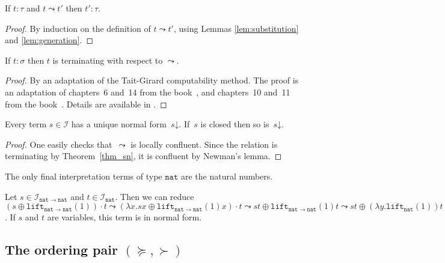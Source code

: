 \documentclass[a4paper,UKenglish,cleveref,autoref,numberwithinsect]{lipics-v2019}
\theoremstyle{definition}
\newcommand{\Iterms}{\mathcal{I}}
\newcommand{\arrtype}{\rightarrow}
\newcommand{\abs}[2]{\lambda #1.#2}
\newcommand{\arrW}{\leadsto}
\newcommand{\nat}{\mathtt{nat}}
\newcommand{\lift}{\mathtt{lift}}
\newcommand{\da}{\mathord{\downarrow}}
\begin{document}
\begin{lemma}
  If $t : \tau$ and $t \arrW t'$ then $t' : \tau$.
\end{lemma}

\begin{proof}
  By induction on the definition of $t \arrW t'$, using
  Lemmas \ref{lem:substitution} and \ref{lem:generation}.
\end{proof}

\begin{theorem}\label{thm_sn}
  If $t : \sigma$ then $t$ is terminating with respect to $\arrW$.
\end{theorem}

\begin{proof}
  By an adaptation of the Tait-Girard computability method. The proof
  is an adaptation of chapters~6 and~14 from the
  book~\cite{Girard1989}, and chapters~10 and~11 from the
  book~\cite{SorensenUrzyczyn2006}.
  Details are available in \cite[Appendix A.1]{versionwithappendix}.
\end{proof}

\begin{lemma}\label{lem_unique_final}
  Every term $s \in \Iterms$ has a unique normal form~$s\da$. If~$s$
  is closed then so is~$s\da$.
\end{lemma}

\begin{proof}
  One easily
  checks that~$\arrW$ is locally confluent. Since the
  relation is
  terminating by Theorem~\ref{thm_sn}, it is confluent by Newman's
  lemma.
\end{proof}

\begin{lemma}\label{lem_final_nat}
  The only final interpretation terms of type $\nat$ are the natural
  numbers.
\end{lemma}

\begin{example}\label{ex:arrWreduce}
Let $s \in \Iterms_{\nat \arrtype \nat}$ and $t \in
\Iterms_\nat$. Then we can reduce
$(s \oplus \lift_{\nat \arrtype \nat}(1)) \cdot t \arrW
(\abs{x}{s x \oplus \lift_{\nat \arrtype \nat}(1)x}) \cdot t \arrW
s t \oplus \lift_{\nat \arrtype \nat}(1)t \arrW
s t \oplus (\abs{y}{\lift_{\nat}(1)})t \arrW
s t \oplus \lift_\nat(1) \arrW
s t \oplus 1$. If $s$ and $t$ are variables, this term is in normal
form.
\end{example}

\subsection{The ordering pair $(\succeq,\succ)$}\label{subsec:succ}
\end{document}

